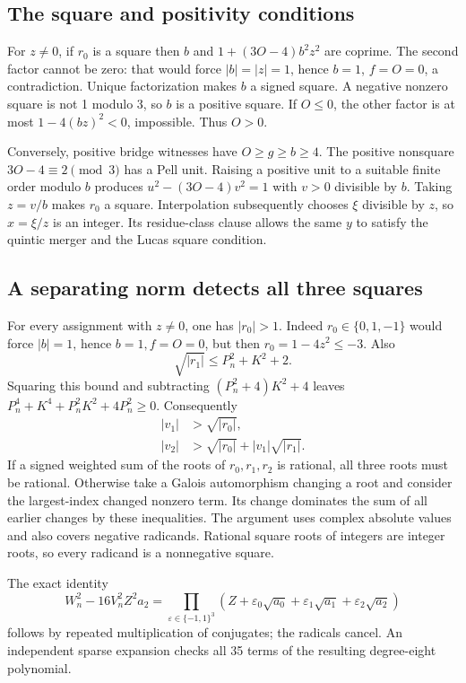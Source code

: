 \documentclass[11pt,letterpaper]{article}
\theoremstyle{definition}\newtheorem{definition}[theorem]{Definition}
\begin{document}
\subsection{The square and positivity conditions}
For $z\ne0$, if $r_0$ is a square then $b$ and
$1+(3O-4)b^2z^2$ are coprime. The second factor cannot be zero: that
would force $|b|=|z|=1$, hence $b=1$, $f=O=0$, a contradiction.
Unique factorization makes $b$ a signed square. A negative nonzero square
is not 1 modulo 3, so $b$ is a positive square. If $O\le0$, the other
factor is at most $1-4(bz)^2<0$, impossible. Thus $O>0$.

Conversely, positive bridge witnesses have $O\ge g\ge b\ge4$.
The positive nonsquare $3O-4\equiv2\pmod3$ has a Pell unit. Raising a
positive unit to a suitable finite order modulo $b$ produces
$u^2-(3O-4)v^2=1$ with $v>0$ divisible by $b$. Taking $z=v/b$ makes
$r_0$ a square. Interpolation subsequently chooses $\xi$ divisible by
$z$, so $x=\xi/z$ is an integer. Its residue-class clause allows the
same $y$ to satisfy the quintic merger and the Lucas square condition.

\subsection{A separating norm detects all three squares}
For every assignment with $z\ne0$, one has $|r_0|>1$. Indeed
$r_0\in\{0,1,-1\}$ would force $|b|=1$, hence $b=1,f=O=0$,
but then $r_0=1-4z^2\le-3$. Also
\[
\sqrt{|r_1|}\le P_n^2+K^2+2.
\]
Squaring this bound and subtracting $(P_n^2+4)K^2+4$ leaves
$P_n^4+K^4+P_n^2K^2+4P_n^2\ge0$. Consequently
\begin{align*}
|v_1|&>\sqrt{|r_0|},\\
|v_2|&>\sqrt{|r_0|}+|v_1|\sqrt{|r_1|}.
\end{align*}
If a signed weighted sum of the roots of $r_0,r_1,r_2$ is rational,
all three roots must be rational. Otherwise take a Galois automorphism
changing a root and consider the largest-index changed nonzero term.
Its change dominates the sum of all earlier changes by these inequalities.
The argument uses complex absolute values and also covers negative radicands.
Rational square roots of integers are integer roots, so every radicand is
a nonnegative square.

The exact identity
\begin{equation}
W_n^2-16V_n^2Z^2a_2=
\prod_{\varepsilon\in\{-1,1\}^3}
\left(Z+\varepsilon_0\sqrt{a_0}
        +\varepsilon_1\sqrt{a_1}+\varepsilon_2\sqrt{a_2}\right)
\label{eq:normidentity}
\end{equation}
follows by repeated multiplication of conjugates; the radicals cancel.
An independent sparse expansion checks all 35 terms of the resulting
degree-eight polynomial.
\end{document}
